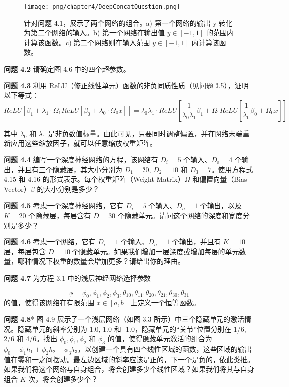 \begin{figure}[ht!]
	\centering
	\texttt{[image: png/chapter4/DeepConcatQuestion.png]}
	\caption{针对问题 4.1，展示了两个网络的组合。a) 第一个网络的输出 y 转化为第二个网络的输入。b) 第一个网络在输出值 \(y \in [−1, 1]\) 的范围内计算该函数。c) 第二个网络则在输入范围 \(y \in [−1, 1]\) 内计算该函数。}
\end{figure}

\textbf{问题 4.2} 请确定图 4.6 中的四个超参数。

\textbf{问题 4.3} 利用 ReLU（修正线性单元）函数的非负同质性质（见问题 3.5），证明以下等式：
\begin{equation}
ReLU[\beta_1 + \lambda_1 \cdot \Omega_1 ReLU[\beta_0 + \lambda_0 \cdot \Omega_0 x]] = \lambda_0\lambda_1 · ReLU[\frac{1}{\lambda_0\lambda_1} \beta_1 + \Omega_1 ReLU[\frac{1}{\lambda_0} \beta_0 + \Omega_0 x]]  
\end{equation}

其中 \(\lambda_0\) 和 \(\lambda_1\) 是非负数值标量。由此可见，只要同时调整偏置，并在网络末端重新应用这些缩放因子，就可以任意缩放权重矩阵。

\textbf{问题 4.4} 编写一个深度神经网络的方程，该网络有 \(D_i = 5\) 个输入、\(D_o = 4\) 个输出，并且有三个隐藏层，其大小分别为 \(D_1 = 20\), \(D_2 = 10\) 和 \(D_3 = 7\)。使用方程式 4.15 和 4.16 的形式表示。每个权重矩阵（Weight Matrix）\(\Omega\) 和偏置向量（Bias Vector）\(\beta\) 的大小分别是多少？

\textbf{问题 4.5} 考虑一个深度神经网络，它有 \(D_i = 5\) 个输入、\(D_o = 1\) 个输出，以及 \(K = 20\) 个隐藏层，每层含有 \(D = 30\) 个隐藏单元。请问这个网络的深度和宽度分别是多少？

\textbf{问题 4.6} 考虑一个网络，它有 \(D_i = 1\) 个输入、\(D_o = 1\) 个输出，并且有 \(K = 10\) 层，每层包含 \(D = 10\) 个隐藏单元。如果我们增加一层深度或增加每层的单元数量，哪种情况下权重的数量会增加更多？请给出你的理由。

\textbf{问题 4.7} 为方程 3.1 中的浅层神经网络选择参数 

\begin{equation*}
\phi = {\phi_0, \phi_1, \phi_2, \phi_3, \theta_{10}, \theta_{11}, \theta_{20}, \theta_{21}, \theta_{30}, \theta_{31}}
\end{equation*}
的值，使得该网络在有限范围 \(x \in [a, b]\) 上定义一个恒等函数。

\textbf{问题 4.8}* 图 4.9 展示了一个浅层网络（如图 3.3 所示）中三个隐藏单元的激活情况。隐藏单元的斜率分别为 1.0, 1.0 和 -1.0，隐藏单元的“关节”位置分别在 1/6, 2/6 和 4/6。找出 \(\phi_0, \phi_1, \phi_2\) 和 \(\phi_3\) 的值，使得隐藏单元激活的组合为 \(\phi_0 + \phi_1 h_1 + \phi_2 h_2 + \phi_3 h_3\)，以创建一个具有四个线性区域的函数，这些区域的输出值在零和一之间摆动。最左边区域的斜率应该是正的，下一个是负的，依此类推。如果我们将这个网络与自身组合，将会创建多少个线性区域？如果我们将其与自身组合 \(K\) 次，将会创建多少个？


